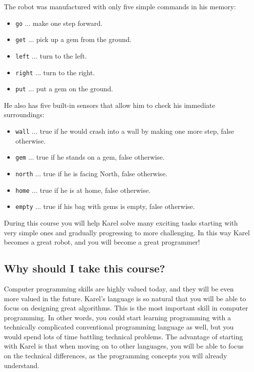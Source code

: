\noindent
The robot was manufactured with only five simple commands in his memory:
\begin{itemize}
\item {\color{green} \tt go} ... make one step forward.
\item {\color{green} \tt get} ... pick up a gem from the ground. 
\item {\color{green} \tt left} ... turn to the left.
\item {\color{green} \tt right} ... turn to the right. 
\item {\color{green} \tt put} ... put a gem on the ground. 
\end{itemize}
He also has five built-in sensors that allow him to check his immediate surroundings:
\begin{itemize}
\item {\color{green} \tt wall} ... true if he would crash into a wall by making one more step, false otherwise. 
\item {\color{green} \tt gem} ... true if he stands on a gem, false otherwise.
\item {\color{green} \tt north} ... true if he is facing North, false otherwise.
\item {\color{green} \tt home} ... true if he is at home, false otherwise.
\item {\color{green} \tt empty} ... true if his bag with gems is empty, false otherwise. 
\end{itemize}
During this course you will help Karel solve many exciting tasks starting with very simple ones and 
gradually progressing to more challenging. In this way Karel becomes a great robot, and you 
will become a great programmer!

\subsection{Why should I take this course?}

Computer programming skills are highly valued today, and they will be even more 
valued in the future. Karel's language is so natural that you will be able to 
focus on designing great algorithms. This is the most important skill in 
computer programming. In other words, you could start learning programming 
with a technically 
complicated conventional programming language as well, but you would spend lots of time 
battling technical problems. The advantage of starting with Karel is that 
when moving on to other languages, you will be able to focus on the technical 
differences, as the programming concepts you will already understand.


